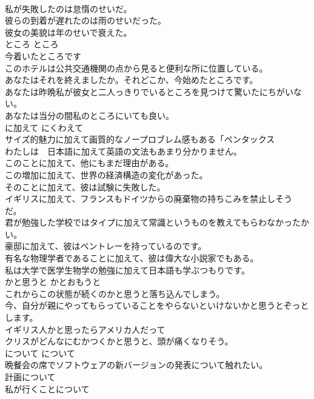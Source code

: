 \documentclass[8pt]{extreport}
\begin{document}
\begin{CJK}{UTF8}{min}
\\	私が失敗したのは怠惰のせいだ。   
\\	彼らの到着が遅れたのは雨のせいだった。   
\\	彼女の美貌は年のせいで衰えた。   
\\	ところ	ところ	
\\	今着いたところです  
\\	このホテルは公共交通機関の点から見ると便利な所に位置している。  
\\	あなたはそれを終えましたか。それどこか、今始めたところです。   
\\	あなたは昨晩私が彼女と二人っきりでいるところを見つけて驚いたにちがいない。   
\\	あなたは当分の間私のところにいても良い。   
\\	に加えて	にくわえて	
\\	サイズ的魅力に加えて画質的なノープロブレム感もある「ペンタックス 
\\	わたしは　日本語に加えて英語の文法もあまり分かりません。  
\\	このことに加えて、他にもまだ理由がある。  
\\	この増加に加えて、世界の経済構造の変化があった。  
\\	そのことに加えて、彼は試験に失敗した。  
\\	イギリスに加えて、フランスもドイツからの廃棄物の持ちこみを禁止しそうだ。  
\\	君が勉強した学校ではタイプに加えて常識というものを教えてもらわなかったかい。  
\\	豪邸に加えて、彼はベントレーを持っているのです。  
\\	有名な物理学者であることに加えて、彼は偉大な小説家でもある。  
\\	私は大学で医学生物学の勉強に加えて日本語も学ぶつもりです。  
\\	かと思うと	かとおもうと	
\\	これからこの状態が続くのかと思うと落ち込んでしまう。  
\\	今、自分が親にやってもらっていることをやらないといけないかと思うとぞっとします。  
\\	イギリス人かと思ったらアメリカ人だって  
\\	クリスがどんなにむかつくかと思うと、頭が痛くなりそう。  
\\	について	について	
\\	晩餐会の席でソフトウェアの新バージョンの発表について触れたい。  
\\	計画について  
\\	私が行くことについて  

\end{CJK}
\end{document}
